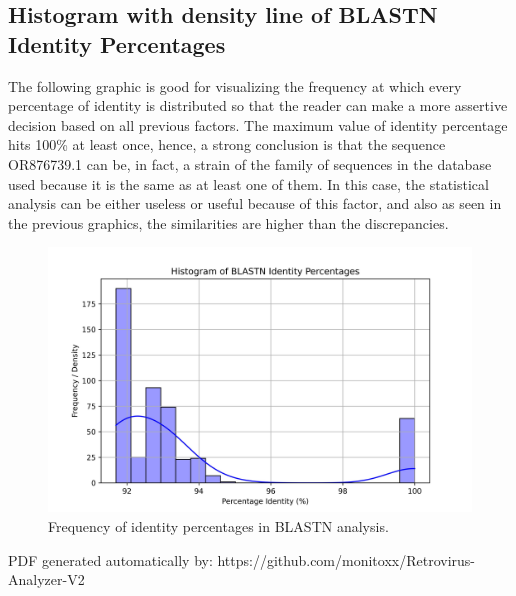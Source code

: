 \documentclass{article}%
\begin{document}
\subsection{Histogram with density line of BLASTN Identity Percentages}%
\label{subsec:HistogramwithdensitylineofBLASTNIdentityPercentages}%
The following graphic is good for visualizing the frequency at which every percentage of identity is distributed so that the reader can make a more assertive decision based on all previous factors.\newline%
\newline%
The maximum value of identity percentage hits 100\% at least once, hence, a strong conclusion is that the sequence OR876739.1 can be, in fact, a strain of the family of sequences in the database used because it is the same as at least one of them. \newline%
\newline%
In this case, the statistical analysis can be either useless or useful because of this factor, and also as seen in the previous graphics, the similarities are higher than the discrepancies. %


\begin{figure}[!htbp]%
\centering%
\includegraphics[width=1\textwidth]{hist_kde_pident.jpg}%
\caption{Frequency of identity percentages in BLASTN analysis.}%
\end{figure}

%
PDF generated automatically by: https://github.com/monitoxx/Retrovirus{-}Analyzer{-}V2

%
\end{document}
